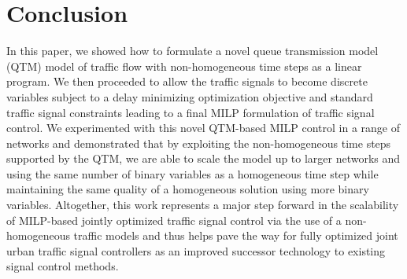 \section{Conclusion}

In this paper, we showed how to formulate a novel queue transmission
model (QTM) model of traffic flow with non-homogeneous time steps as a
linear program.  We then proceeded to allow the traffic signals to
become discrete variables subject to a delay minimizing optimization
objective and standard traffic signal constraints leading to a final
MILP formulation of traffic signal control.  We experimented with this
novel QTM-based MILP control in a range of networks and demonstrated
that by exploiting the non-homogeneous time steps supported by the
QTM, we are able to scale the model up to larger networks and using
the same number of binary variables as a homogeneous time step while
maintaining the same quality of a homogeneous solution using more
binary variables.  Altogether, this work represents a major step
forward in the scalability of MILP-based jointly optimized traffic
signal control via the use of a non-homogeneous traffic models and thus
helps pave the way for fully optimized joint urban traffic signal
controllers as an improved successor technology to existing signal
control methods.

